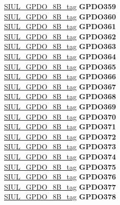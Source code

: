 \begin{DoxyCompactItemize}
\begin{tabbing}
\>\>\mbox{\hyperlink{unionSIUL__GPDO__8B__tag}{SIUL\_GPDO\_8B\_tag}} {\bfseries GPDO359}\\
\>\>\mbox{\hyperlink{unionSIUL__GPDO__8B__tag}{SIUL\_GPDO\_8B\_tag}} {\bfseries GPDO360}\\
\>\>\mbox{\hyperlink{unionSIUL__GPDO__8B__tag}{SIUL\_GPDO\_8B\_tag}} {\bfseries GPDO361}\\
\>\>\mbox{\hyperlink{unionSIUL__GPDO__8B__tag}{SIUL\_GPDO\_8B\_tag}} {\bfseries GPDO362}\\
\>\>\mbox{\hyperlink{unionSIUL__GPDO__8B__tag}{SIUL\_GPDO\_8B\_tag}} {\bfseries GPDO363}\\
\>\>\mbox{\hyperlink{unionSIUL__GPDO__8B__tag}{SIUL\_GPDO\_8B\_tag}} {\bfseries GPDO364}\\
\>\>\mbox{\hyperlink{unionSIUL__GPDO__8B__tag}{SIUL\_GPDO\_8B\_tag}} {\bfseries GPDO365}\\
\>\>\mbox{\hyperlink{unionSIUL__GPDO__8B__tag}{SIUL\_GPDO\_8B\_tag}} {\bfseries GPDO366}\\
\>\>\mbox{\hyperlink{unionSIUL__GPDO__8B__tag}{SIUL\_GPDO\_8B\_tag}} {\bfseries GPDO367}\\
\>\>\mbox{\hyperlink{unionSIUL__GPDO__8B__tag}{SIUL\_GPDO\_8B\_tag}} {\bfseries GPDO368}\\
\>\>\mbox{\hyperlink{unionSIUL__GPDO__8B__tag}{SIUL\_GPDO\_8B\_tag}} {\bfseries GPDO369}\\
\>\>\mbox{\hyperlink{unionSIUL__GPDO__8B__tag}{SIUL\_GPDO\_8B\_tag}} {\bfseries GPDO370}\\
\>\>\mbox{\hyperlink{unionSIUL__GPDO__8B__tag}{SIUL\_GPDO\_8B\_tag}} {\bfseries GPDO371}\\
\>\>\mbox{\hyperlink{unionSIUL__GPDO__8B__tag}{SIUL\_GPDO\_8B\_tag}} {\bfseries GPDO372}\\
\>\>\mbox{\hyperlink{unionSIUL__GPDO__8B__tag}{SIUL\_GPDO\_8B\_tag}} {\bfseries GPDO373}\\
\>\>\mbox{\hyperlink{unionSIUL__GPDO__8B__tag}{SIUL\_GPDO\_8B\_tag}} {\bfseries GPDO374}\\
\>\>\mbox{\hyperlink{unionSIUL__GPDO__8B__tag}{SIUL\_GPDO\_8B\_tag}} {\bfseries GPDO375}\\
\>\>\mbox{\hyperlink{unionSIUL__GPDO__8B__tag}{SIUL\_GPDO\_8B\_tag}} {\bfseries GPDO376}\\
\>\>\mbox{\hyperlink{unionSIUL__GPDO__8B__tag}{SIUL\_GPDO\_8B\_tag}} {\bfseries GPDO377}\\
\>\>\mbox{\hyperlink{unionSIUL__GPDO__8B__tag}{SIUL\_GPDO\_8B\_tag}} {\bfseries GPDO378}\\

\end{tabbing}
\end{DoxyCompactItemize}
